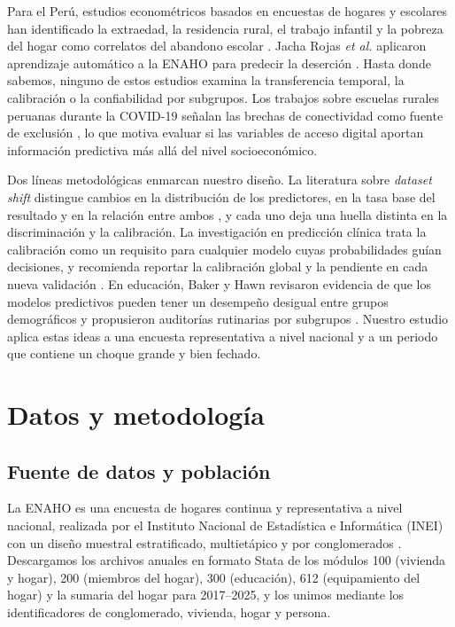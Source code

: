 \documentclass[conference]{IEEEtran}
\begin{document}
Para el Perú, estudios econométricos basados en encuestas de hogares y escolares han identificado la extraedad, la residencia rural, el trabajo infantil y la pobreza del hogar como correlatos del abandono escolar \cite{cavero2011,alcazar2009}. Jacha Rojas \textit{et al.} aplicaron aprendizaje automático a la ENAHO para predecir la deserción \cite{jacha2024}. Hasta donde sabemos, ninguno de estos estudios examina la transferencia temporal, la calibración o la confiabilidad por subgrupos. Los trabajos sobre escuelas rurales peruanas durante la COVID-19 señalan las brechas de conectividad como fuente de exclusión \cite{anaya2021}, lo que motiva evaluar si las variables de acceso digital aportan información predictiva más allá del nivel socioeconómico.

Dos líneas metodológicas enmarcan nuestro diseño. La literatura sobre \textit{dataset shift} distingue cambios en la distribución de los predictores, en la tasa base del resultado y en la relación entre ambos \cite{moreno2012}, y cada uno deja una huella distinta en la discriminación y la calibración. La investigación en predicción clínica trata la calibración como un requisito para cualquier modelo cuyas probabilidades guían decisiones, y recomienda reportar la calibración global y la pendiente en cada nueva validación \cite{vancalster2019}. En educación, Baker y Hawn revisaron evidencia de que los modelos predictivos pueden tener un desempeño desigual entre grupos demográficos y propusieron auditorías rutinarias por subgrupos \cite{baker2022}. Nuestro estudio aplica estas ideas a una encuesta representativa a nivel nacional y a un periodo que contiene un choque grande y bien fechado.

\section{Datos y metodología}

\subsection{Fuente de datos y población}
La ENAHO es una encuesta de hogares continua y representativa a nivel nacional, realizada por el Instituto Nacional de Estadística e Informática (INEI) con un diseño muestral estratificado, multietápico y por conglomerados \cite{inei}. Descargamos los archivos anuales en formato Stata de los módulos 100 (vivienda y hogar), 200 (miembros del hogar), 300 (educación), 612 (equipamiento del hogar) y la sumaria del hogar para 2017--2025, y los unimos mediante los identificadores de conglomerado, vivienda, hogar y persona.
\end{document}
